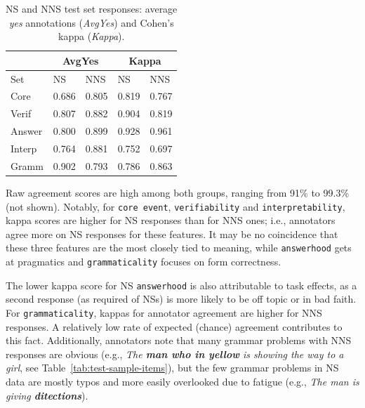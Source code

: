 \documentclass[11pt,a4paper]{article}
\newcommand{\feat}[1]{\texttt{#1}}
\begin{document}
\begin{table}[htb!]
\begin{center}
\begin{tabular}{|l||l|l||l|l|}
\hline
 & \multicolumn{2}{|c||}{AvgYes} & \multicolumn{2}{|c|}{Kappa} \\
\hline
 Set & NS & NNS & NS & NNS \\
\hline
\hline
Core  & 0.686 & 0.805 & 0.819 & 0.767 \\
\hline
Verif  & 0.807 & 0.882 & 0.904 & 0.819 \\
\hline
Answer  & 0.800 & 0.899 & 0.928 & 0.961 \\
\hline
Interp  & 0.764 & 0.881 & 0.752 & 0.697 \\
\hline
Gramm  & 0.902 & 0.793 & 0.786 & 0.863 \\
\hline
\end{tabular}
\caption{\label{tab:NSvNNSagreement} NS and NNS test set responses: average \textit{yes} annotations (\textit{AvgYes}) and Cohen's kappa (\textit{Kappa}).}
\end{center}
\end{table}



Raw agreement scores are high among both groups, ranging from 91\% to 99.3\% (not shown). Notably, for \feat{core event}, \feat{verifiability} and \feat{interpretability}, kappa scores are higher for NS responses than for NNS ones; i.e., annotators agree more on NS responses for these features. It may be no coincidence that these three features are the most closely tied to meaning, while \feat{answerhood} gets at pragmatics and \feat{grammaticality} focuses on form correctness.

The lower kappa score for NS \feat{answerhood} is also attributable to task effects, as a second response (as required of NSs) is more likely to be off topic or in bad faith. For \feat{grammaticality}, kappas for annotator agreement are higher for NNS responses. A relatively low rate of expected (chance) agreement contributes to this fact. Additionally, annotators note that many grammar problems with NNS responses are obvious (e.g., \textit{The \textbf{man who in yellow} is showing the way to a girl}, see Table~\ref{tab:test-sample-items}), but the few grammar problems in NS data are mostly typos and more easily overlooked due to fatigue (e.g., \textit{The man is giving \textbf{ditections}}).
\end{document}
